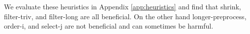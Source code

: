 We evaluate these heuristics in Appendix \ref{app:heuristics} and find that
\textsf{shrink}, \textsf{filter-triv}, and \textsf{filter-long} are all
beneficial. On the other hand \textsf{longer-preprocess}, \textsf{order-i}, and
\textsf{select-j} are not beneficial and can sometimes be harmful.









